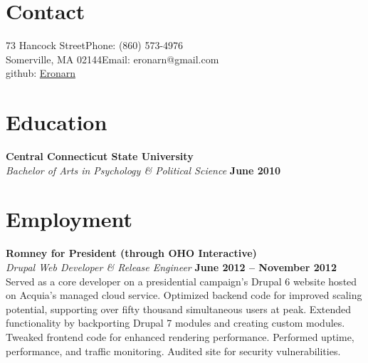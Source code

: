 \documentclass[margin,line]{resume}
\begin{document}
\begin{resume}

    \section{\mysidestyle Contact}

    73 Hancock Street\hfill Phone: (860) 573-4976          \vspace{0mm}\\\vspace{0mm}%
    Somerville, MA 02144\hfill Email: eronarn@gmail.com  \vspace{0mm}\\\vspace{-4.5mm}%
    \hfill github: \href{https://github.com/Eronarn}{Eronarn}  \vspace{0mm}\\\vspace{-4.5mm}%
    \section{\mysidestyle Education}

    \textbf{Central Connecticut State University} \vspace{2mm}\\\vspace{1mm}%
    \textsl{Bachelor of Arts in Psychology \& Political Science} \hfill \textbf{June 2010}\vspace{-3mm}\\\vspace{-1mm}%

    \section{\mysidestyle Employment}

    \textbf{Romney for President (through OHO Interactive)} \vspace{2mm}\\\vspace{1mm}%
    \textsl{Drupal Web Developer \& Release Engineer} \hfill \textbf{June 2012 -- November 2012}\\
    Served as a core developer on a presidential campaign's Drupal 6 website hosted on Acquia's managed cloud service. Optimized backend code for improved scaling potential, supporting over fifty thousand simultaneous users at peak. Extended functionality by backporting Drupal 7 modules and creating custom modules. Tweaked frontend code for enhanced rendering performance. Performed uptime, performance, and traffic monitoring. Audited site for security vulnerabilities.


\end{resume}
\end{document}
